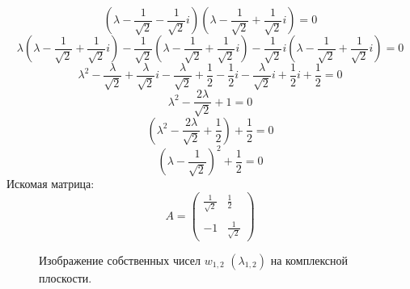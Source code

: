 \documentclass[a5paper, 10pt]{article}
\theoremstyle{definition}
\theoremstyle{plain}
\theoremstyle{remark}
\begin{document}
\begin{equation}
\left( \lambda -  \frac{1}{\sqrt{2}} - \frac{1}{\sqrt{2}} i \right) \left( \lambda -  \frac{1}{\sqrt{2}} + \frac{1}{\sqrt{2}} i  \right) = 0
\end{equation}
\begin{equation}
 \lambda\left( \lambda -  \frac{1}{\sqrt{2}} + \frac{1}{\sqrt{2}} i  \right) -  \frac{1}{\sqrt{2}}\left( \lambda -  \frac{1}{\sqrt{2}} + \frac{1}{\sqrt{2}} i  \right) - \frac{1}{\sqrt{2}} i \left( \lambda -  \frac{1}{\sqrt{2}} + \frac{1}{\sqrt{2}} i  \right) = 0
\end{equation}
\begin{equation}
\lambda^2 -  \frac{ \lambda}{\sqrt{2}} + \frac{ \lambda}{\sqrt{2}} i  -  \frac{\lambda}{\sqrt{2}} +  \frac{1}{2} - \frac{1}{2} i  - \frac{ \lambda}{\sqrt{2}} i  +  \frac{1}{2}i + \frac{1}{2}= 0
\end{equation}
\begin{equation}
\lambda^2 -  \frac{ 2 \lambda}{\sqrt{2}} + 1= 0
\end{equation}
\begin{equation}
\left( \lambda^2 -  \frac{ 2 \lambda}{\sqrt{2}} + \frac{1}{2} \right) + \frac{1}{2}= 0
\end{equation}
\begin{equation}
\left( \lambda -  \frac{ 1}{\sqrt{2}} \right)^2  + \frac{1}{2}= 0
\end{equation}
Искомая матрица:
\begin{equation}
A =
\begin{pmatrix}
 \frac{ 1}{\sqrt{2}} &  \frac{1}{2} \\
\\
-1 &  \frac{ 1}{\sqrt{2}}
\end{pmatrix}
\end{equation}

\begin{figure}[h!]
\caption{Изображение собственных чисел $w_{1, 2} \, \, \left( \lambda_{1, 2} \right)$ на комплексной плоскости.}
\end{figure}
\end{document}
